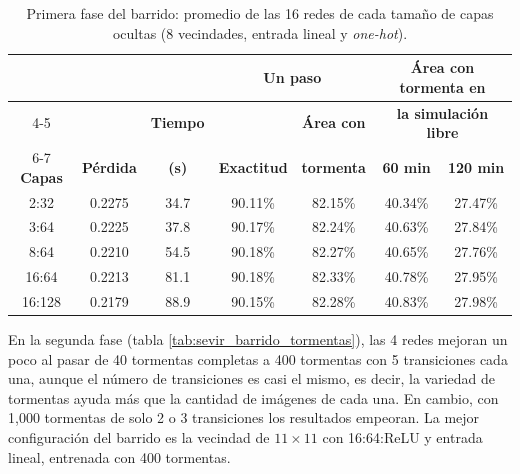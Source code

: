 \begin{table}[htbp]
	\centering
	\footnotesize
	\begin{tabular}{@{}ccccccc@{}}
		\toprule
		& & & \multicolumn{2}{c}{\textbf{Un paso}} & \multicolumn{2}{c}{\textbf{Área con tormenta en}} \\
		\cmidrule(lr){4-5}
		& & \textbf{Tiempo} & & \textbf{Área con} & \multicolumn{2}{c}{\textbf{la simulación libre}} \\
		\cmidrule(l){6-7}
		\textbf{Capas} & \textbf{Pérdida} & \textbf{(s)} & \textbf{Exactitud} & \textbf{tormenta} & \textbf{60 min} & \textbf{120 min} \\ \midrule
		2:32 & 0.2275 & 34.7 & 90.11\% & 82.15\% & 40.34\% & 27.47\% \\
		3:64 & 0.2225 & 37.8 & 90.17\% & 82.24\% & 40.63\% & 27.84\% \\
		8:64 & 0.2210 & 54.5 & 90.18\% & 82.27\% & 40.65\% & 27.76\% \\
		16:64 & 0.2213 & 81.1 & 90.18\% & 82.33\% & 40.78\% & 27.95\% \\
		16:128 & 0.2179 & 88.9 & 90.15\% & 82.28\% & 40.83\% & 27.98\% \\
		\bottomrule
	\end{tabular}
	\caption{Primera fase del barrido: promedio de las 16 redes de cada tamaño de capas ocultas (8 vecindades, entrada lineal y \textit{one-hot}).}
	\label{tab:sevir_barrido_capas}
\end{table}

En la segunda fase (tabla \ref{tab:sevir_barrido_tormentas}), las 4 redes mejoran un poco al pasar de 40 tormentas completas a 400 tormentas con 5 transiciones cada una, aunque el número de transiciones es casi el mismo, es decir, la variedad de tormentas ayuda más que la cantidad de imágenes de cada una. En cambio, con 1,000 tormentas de solo 2 o 3 transiciones los resultados empeoran. La mejor configuración del barrido es la vecindad de $11 \times 11$ con 16:64:ReLU y entrada lineal, entrenada con 400 tormentas.

